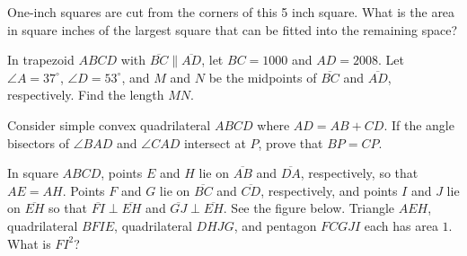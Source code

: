 \documentclass[mast]{lucky}
\begin{document}
\begin{prob}[AMC 8 2017/25]{3}
One-inch squares are cut from the corners of this 5 inch square.  What is the area in square inches of the largest square that can be fitted into the remaining space?

\begin{center}
\end{center}

\end{prob}

\begin{prob}[AIME II 2008/5]{3}
In trapezoid $ABCD$ with $\overline{BC}\parallel\overline{AD}$, let $BC = 1000$ and $AD = 2008$. Let $\angle A = 37^\circ$, $\angle D = 53^\circ$, and $M$ and $N$ be the midpoints of $\overline{BC}$ and $\overline{AD}$, respectively. Find the length $MN$.
\end{prob}

\begin{prob}{4}
Consider simple convex quadrilateral $ABCD$ where $AD=AB+CD.$ If the angle bisectors of $\angle BAD$ and $\angle CAD$ intersect at $P$, prove that $BP=CP.$ %
\end{prob}

\begin{req}[AMC 10B 2020/21]{9}
In square $ABCD$, points $E$ and $H$ lie on $\overline{AB}$ and $\overline{DA}$, respectively, so that $AE=AH.$ Points $F$ and $G$ lie on $\overline{BC}$ and $\overline{CD}$, respectively, and points $I$ and $J$ lie on $\overline{EH}$ so that $\overline{FI} \perp \overline{EH}$ and $\overline{GJ} \perp \overline{EH}$. See the figure below. Triangle $AEH$, quadrilateral $BFIE$, quadrilateral $DHJG$, and pentagon $FCGJI$ each has area $1.$ What is $FI^2$?
\end{req}
\end{document}
